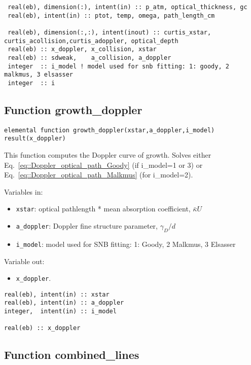 \begin{lstlisting}
 real(eb), dimension(:), intent(in) :: p_atm, optical_thickness, gc
 real(eb), intent(in) :: ptot, temp, omega, path_length_cm

 real(eb), dimension(:,:), intent(inout) :: curtis_xstar, curtis_acollision,curtis_adoppler, optical_depth
 real(eb) :: x_doppler, x_collision, xstar
 real(eb) :: sdweak,    a_collision, a_doppler
 integer  :: i_model ! model used for snb fitting: 1: goody, 2 malkmus, 3 elsasser
 integer  :: i
\end{lstlisting}

\subsection{Function growth\_doppler}

\begin{lstlisting}
elemental function growth_doppler(xstar,a_doppler,i_model) result(x_doppler)
\end{lstlisting}

This function computes the Doppler curve of growth. Solves either Eq.~\ref{eq::Doppler_optical_path_Goody} (if i\_model=1 or 3) or Eq.~\ref{eq::Doppler_optical_path_Malkmus} (for i\_model=2).

Variables in:
\begin{itemize}
 \item \verb=xstar=: optical pathlength * mean absorption coefficient, $\bar{\kappa}U$
 \item \verb=a_doppler=: Doppler fine structure parameter, $\gamma_D/d$
 \item \verb=i_model=: model used for SNB fitting: 1: Goody, 2 Malkmus, 3 Elsasser
\end{itemize}

Variable out:
\begin{itemize}
 \item \verb=x_doppler=.
\end{itemize}

\begin{lstlisting}
real(eb), intent(in) :: xstar
real(eb), intent(in) :: a_doppler
integer,  intent(in) :: i_model

real(eb) :: x_doppler
\end{lstlisting}

\subsection{Function combined\_lines}

